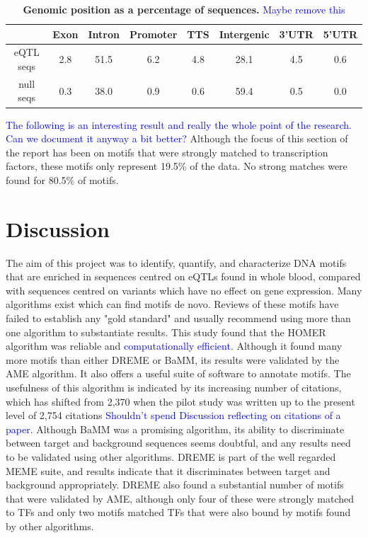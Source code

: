 \documentclass[12pt]{article}
\begin{document}
\begin{table}
\caption{{\bf Genomic position as a percentage of sequences.} \textcolor{blue}{Maybe remove this}}
\label{genomicPosition}
\centering
\begin{tabular}{|c|c|c|c|c|c|c|c|}
\hline
& Exon & Intron & Promoter & TTS & Intergenic & 3'UTR & 5'UTR\\
\hline
eQTL seqs & 2.8 & 51.5 & 6.2 & 4.8 & 28.1 & 4.5 & 0.6\\
\hline
null seqs & 0.3 & 38.0 & 0.9 & 0.6 & 59.4 & 0.5 & 0.0\\
\hline
\end{tabular}
\end{table}

\textcolor{blue}{The following is an interesting result and really the whole point of the research. Can we document it anyway a bit better? }
Although the focus of this section of the report has been on motifs that were strongly matched to transcription factors, these motifs only represent 19.5\% of the data. No strong matches were found for 80.5\% of motifs. 


\section{Discussion}


The aim of this project was to identify, quantify, and characterize DNA motifs that are enriched in sequences centred on eQTLs found in whole blood, compared with sequences centred on variants which have no effect on gene expression.
Many algorithms exist which can find motifs de novo. Reviews of these motifs have failed to establish any "gold standard" and usually recommend using more than one algorithm to substantiate results. This study found that the HOMER algorithm was reliable and \textcolor{blue}{computationally efficient}. Although it found many more motifs than either DREME or BaMM, its results were validated by the AME algorithm. It also offers a useful suite of software to annotate motifs. The usefulness of this algorithm is indicated by its increasing number of citations, which has shifted from 2,370 when the pilot study was written up to the present level of 2,754 citations \textcolor{blue}{Shouldn't spend Discussion reflecting on citations of a paper}. Although BaMM was a promising algorithm, its ability to discriminate between target and background sequences seems doubtful, and any results need to be validated using other algorithms. DREME is part of the well regarded MEME suite, and results indicate that it discriminates between target and background appropriately. DREME also found a substantial number of motifs that were validated by AME, although only four of these were strongly matched to TFs and only two motifs matched TFs that were also bound by motifs found by other algorithms.
\end{document}
